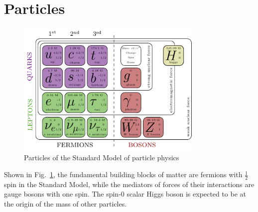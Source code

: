 \section{Particles}
\begin{figure}[htbp]
  \centering
  \includegraphics[width=0.8\textwidth]{chapters/c1/figures/SM-particle-table}
  \caption{Particles of the Standard Model of particle physics}
  \label{fig:c1Standard Modelparticletable}
\end{figure}
\par Shown in Fig.~\ref{fig:c1Standard Modelparticletable}, the fundamental building blocks of matter are fermions with $\frac{1}{2}$ 
spin in the Standard Model, while the mediators of forces of their interactions are gauge bosons with one spin. 
The spin-0 scalar Higgs boson is expected to be at the origin of the mass of other particles.


